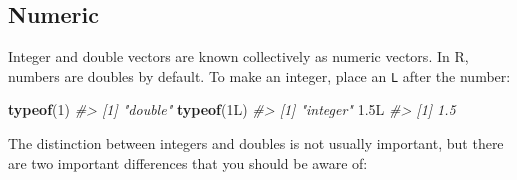 \documentclass[]{book}
\newenvironment{Shaded}{\begin{snugshade}}{\end{snugshade}}
\newcommand{\KeywordTok}[1]{\textcolor[rgb]{0.13,0.29,0.53}{\textbf{{#1}}}}
\newcommand{\DecValTok}[1]{\textcolor[rgb]{0.00,0.00,0.81}{{#1}}}
\newcommand{\FloatTok}[1]{\textcolor[rgb]{0.00,0.00,0.81}{{#1}}}
\newcommand{\CommentTok}[1]{\textcolor[rgb]{0.56,0.35,0.01}{\textit{{#1}}}}
\newcommand{\NormalTok}[1]{{#1}}
\begin{document}
\subsection{Numeric}\label{numeric}

Integer and double vectors are known collectively as numeric vectors. In
R, numbers are doubles by default. To make an integer, place an
\texttt{L} after the number:

\begin{Shaded}
\begin{Highlighting}[]
\KeywordTok{typeof}\NormalTok{(}\DecValTok{1}\NormalTok{)}
\CommentTok{#> [1] "double"}
\KeywordTok{typeof}\NormalTok{(1L)}
\CommentTok{#> [1] "integer"}
\FloatTok{1.}\NormalTok{5L}
\CommentTok{#> [1] 1.5}
\end{Highlighting}
\end{Shaded}

The distinction between integers and doubles is not usually important,
but there are two important differences that you should be aware of:
\end{document}

